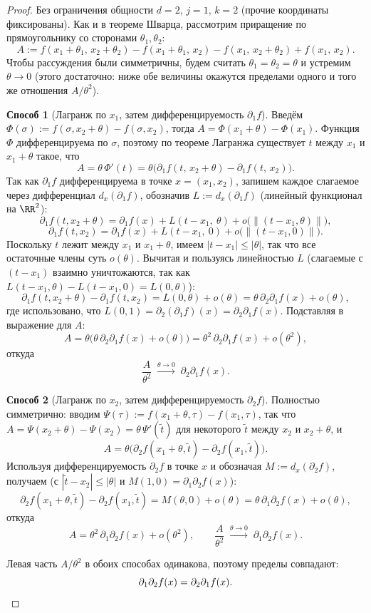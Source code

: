 \begin{proof}
	Без ограничения общности $d=2$, $j=1$, $k=2$ (прочие координаты фиксированы).
	Как и в теореме Шварца, рассмотрим приращение по прямоугольнику со сторонами
	$\theta_1,\theta_2$:
	\[
	A:=f(x_1+\theta_1,\,x_2+\theta_2)
	- f(x_1+\theta_1,\,x_2)
	- f(x_1,\,x_2+\theta_2)
	+ f(x_1,\,x_2).
	\]
	Чтобы рассуждения были симметричны, будем считать $\theta_1=\theta_2=\theta$ и
	устремим $\theta\to 0$ (этого достаточно: ниже обе величины окажутся пределами
	одного и того же отношения $A/\theta^2$).

	\textbf{Способ 1} (Лагранж по $x_1$, затем дифференцируемость $\partial_1 f$).
	Введём $\Phi(\sigma):=f(\sigma,x_2+\theta)-f(\sigma,x_2)$, тогда
	$A=\Phi(x_1+\theta)-\Phi(x_1)$. Функция $\Phi$ дифференцируема по $\sigma$, поэтому
	по теореме Лагранжа существует $t$ между $x_1$ и $x_1+\theta$ такое, что
	\[
	A=\theta\,\Phi'(t)
	=\theta\bigl(\partial_1 f(t,\,x_2+\theta)-\partial_1 f(t,\,x_2)\bigr).
	\]
	Так как $\partial_1 f$ дифференцируема в точке $x=(x_1,x_2)$, запишем каждое
	слагаемое через дифференциал $d_x(\partial_1 f)$, обозначив
	$L:=d_x(\partial_1 f)$ (линейный функционал на $\RR^2$):
	\[
	\partial_1 f(t,x_2+\theta)
	=\partial_1 f(x)+L(t-x_1,\ \theta)+o\!\bigl(\|(t-x_1,\theta)\|\bigr),
	\]
	\[
	\partial_1 f(t,x_2)
	=\partial_1 f(x)+L(t-x_1,\ 0)+o\!\bigl(\|(t-x_1,0)\|\bigr).
	\]
	Поскольку $t$ лежит между $x_1$ и $x_1+\theta$, имеем $|t-x_1|\le|\theta|$, так что
	все остаточные члены суть $o(\theta)$. Вычитая и пользуясь линейностью $L$
	(слагаемые с $(t-x_1)$ взаимно уничтожаются, так как $L(t-x_1,\theta)-L(t-x_1,0)=L(0,\theta)$):
	\[
	\partial_1 f(t,x_2+\theta)-\partial_1 f(t,x_2)
	=L(0,\theta)+o(\theta)
	=\theta\,\partial_2\partial_1 f(x)+o(\theta),
	\]
	где использовано, что $L(0,1)=\partial_2(\partial_1 f)(x)=\partial_2\partial_1 f(x)$.
	Подставляя в выражение для $A$:
	\[
	A=\theta\bigl(\theta\,\partial_2\partial_1 f(x)+o(\theta)\bigr)
	=\theta^2\,\partial_2\partial_1 f(x)+o(\theta^2),
	\]
	откуда
	\[
	\frac{A}{\theta^2}\;\xrightarrow{\theta\to 0}\;\partial_2\partial_1 f(x).
	\]

	\textbf{Способ 2} (Лагранж по $x_2$, затем дифференцируемость $\partial_2 f$).
	Полностью симметрично: вводим $\Psi(\tau):=f(x_1+\theta,\tau)-f(x_1,\tau)$, так что
	$A=\Psi(x_2+\theta)-\Psi(x_2)=\theta\,\Psi'(\tilde t)$ для некоторого $\tilde t$
	между $x_2$ и $x_2+\theta$, и
	\[
	A=\theta\bigl(\partial_2 f(x_1+\theta,\tilde t)-\partial_2 f(x_1,\tilde t)\bigr).
	\]
	Используя дифференцируемость $\partial_2 f$ в точке $x$ и обозначая
	$M:=d_x(\partial_2 f)$, получаем (с $|\tilde t-x_2|\le|\theta|$ и
	$M(1,0)=\partial_1\partial_2 f(x)$):
	\[
	\partial_2 f(x_1+\theta,\tilde t)-\partial_2 f(x_1,\tilde t)
	=M(\theta,0)+o(\theta)
	=\theta\,\partial_1\partial_2 f(x)+o(\theta),
	\]
	откуда
	\[
	A=\theta^2\,\partial_1\partial_2 f(x)+o(\theta^2),
	\qquad
	\frac{A}{\theta^2}\;\xrightarrow{\theta\to 0}\;\partial_1\partial_2 f(x).
	\]

	Левая часть $A/\theta^2$ в обоих способах одинакова, поэтому пределы совпадают:
	\[
	\partial_1\partial_2 f(x)=\partial_2\partial_1 f(x).\qedhere
	\]
\end{proof}

